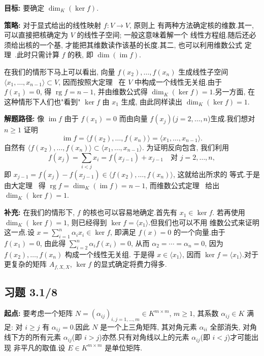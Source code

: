 \noindent\textbf{目标:} 要确定 $\dim_K(\ker f)$.

\noindent\textbf{策略:} 对于显式给出的线性映射 $f \colon V \longrightarrow V$, 原则上
有两种方法确定核的维数.其一, 可以直接把核确定为 $V$ 的线性子空间; 一般这意味着解一个
线性方程组.随后还必须给出核的一个基, 才能把其维数读作该基的长度.其二, 也可以利用维数公式
定理~.此时只需计算 $f$ 的秩, 即 $\dim(\operatorname{im} f)$.

在我们的情形下马上可以看出, 向量 $f(x_2), \ldots, f(x_n)$ 生成线性子空间
$\langle x_1, \ldots, x_{n-1} \rangle \subset V$, 因而按照大定理~
在 $V$ 中构成一个线性无关组.由于 $f(x_1) = 0$, 得 $\operatorname{rg} f = n - 1$,
并由维数公式得 $\dim_K(\ker f) = 1$.另一方面, 在这种情形下人们也"看到" $\ker f$ 由
$x_1$ 生成, 由此同样读出 $\dim_K(\ker f) = 1$.

\noindent\textbf{解题路径:} 像 $\operatorname{im} f$ 由于 $f(x_1) = 0$ 而由向量
$f(x_j)$($j = 2, \ldots, n$)生成.我们想对 $n \geq 1$ 证明
\[
\operatorname{im} f = \langle f(x_2), \ldots, f(x_n) \rangle = \langle x_1, \ldots, x_{n-1} \rangle\text{.}
\]
自然有 $\langle f(x_2), \ldots, f(x_n) \rangle \subset \langle x_1, \ldots, x_{n-1} \rangle$.
为证明反向包含, 我们利用
\[
f(x_j) = \sum_{i < j} x_i = f(x_{j-1}) + x_{j-1} \quad \text{对 } j = 2, \ldots, n,
\]
即 $x_{j-1} = f(x_j) - f(x_{j-1}) \in \langle f(x_2), \ldots, f(x_n) \rangle$, 这就给出所求的
等式.于是由大定理~ 得 $\operatorname{rg} f = \dim_K(\operatorname{im} f) = n - 1$,
而维数公式定理~ 给出 $\dim_K(\ker f) = 1$.

\noindent\textbf{补充:} 在我们的情形下, $f$ 的核也可以容易地确定.首先有 $x_1 \in \ker f$.
若再使用 $\dim_K(\ker f) = 1$, 则已经得到 $\ker f = \langle x_1 \rangle$.但我们也可以不用
维数公式来证明这一点.设 $x = \sum_{i = 1}^{n} \alpha_i x_i \in \ker f$, 即满足 $f(x) = 0$
的一个向量.由于 $f(x_1) = 0$, 由此得 $\sum_{i = 2}^{n} \alpha_i f(x_i) = 0$, 从而
$\alpha_2 = \cdots = \alpha_n = 0$, 因为 $f(x_2), \ldots, f(x_n)$ 构成一个线性无关组.
于是得 $x \in \langle x_1 \rangle$, 因而 $\ker f = \langle x_1 \rangle$.对于更复杂的矩阵
$A_{f, X, X}$, $\ker f$ 的显式确定将费力得多.

\subsection*{习题 3.1/8}

\noindent\textbf{起点:} 要考虑一个矩阵 $N = (\alpha_{ij})_{i, j = 1, \ldots, m} \in K^{m \times m}$,
$m \geq 1$, 其系数 $\alpha_{ij} \in K$ 满足: 对 $i \geq j$ 有 $\alpha_{ij} = 0$.因此 $N$
是一个上三角矩阵, 其对角元素 $\alpha_{ii}$ 全部消失, 对角线下方的所有元素
$\alpha_{ij}$(即 $i > j$)亦然.只有对角线以上的元素 $\alpha_{ij}$(即 $i < j$)才可能出现
非平凡的取值.设 $E \in K^{m \times m}$ 是单位矩阵.

